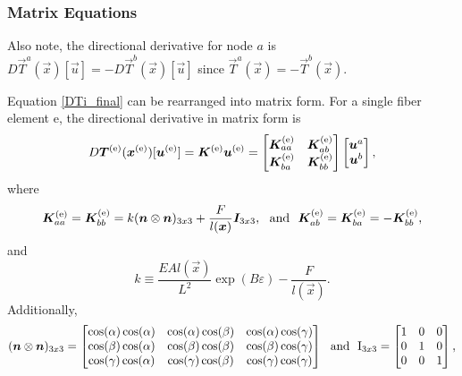 \subsubsection{Matrix Equations}
Also note,  the directional derivative for node $a$ is $D \vec{T}^a(\vec{x})[\vec{u}] = - D\vec{T}^b(\vec{x})[\vec{u}]$ since \(\vec{T}^a(\vec{x})=-\vec{T}^b(\vec{x})\).

Equation \eqref{DTi_final} can be rearranged into matrix form. For a single fiber element e, the directional derivative in matrix form is 
%
\begin{eqnarray}
D\bm{T}^{(\text{e})}(\bm{x}^{(\text{e})})[\bm{u}^{(\text{e})}] = \bm{K}^{(\text{e})}\bm{u}^{(\text{e})} = 
\begin{bmatrix} 
\bm{K}^{(\text{e})}_{aa} & \bm{K}^{(\text{e})}_{ab} \\ 
\bm{K}^{(\text{e})}_{ba}& \bm{K}^{(\text{e})}_{bb} \\
\end{bmatrix}
\begin{bmatrix} 
\bm{u}^{a}  \\ 
\bm{u}^{b} \\ 
\end{bmatrix},
\label{DT^e_matrix}
\end{eqnarray}
%
where
%
\begin{equation}
\bm{K}^{(\text{e})}_{aa} = \bm{K}^{(\text{e})}_{bb} = k (\bm{n} \otimes \bm{n})_{3x3} + \frac{F}{l(\bm{x})}\bm{I}_{3x3}, \ \ \text{and} \ \ \bm{K}^{(\text{e})}_{ab} = \bm{K}^{(\text{e})}_{ba} = -\bm{K}^{(\text{e})}_{bb},
\label{K_aa}
\end{equation}
%
and
%
\begin{equation}
k \equiv \frac{E A  l(\vec{x})}{L^2} \exp(B \varepsilon) -\frac{F}{l(\vec{x})}.
\label{k}
\end{equation}
%
Additionally, 
%
\begin{eqnarray}
(\vec{n} \otimes \vec{n})_{3x3} = 
\begin{bmatrix}
\cos(\alpha)\cos(\alpha) & \cos(\alpha) \cos(\beta) & \cos(\alpha) \cos(\gamma) \\
\cos(\beta)\cos(\alpha) & \cos(\beta)\cos(\beta) & \cos(\beta)\cos(\gamma) \\
\cos(\gamma)\cos(\alpha) & \cos(\gamma)\cos(\beta) & \cos(\gamma)\cos(\gamma) 
\end{bmatrix} \ \ \text{and} \ \
%
\mat{\text{I}}_{3x3} =
\begin{bmatrix}
1 & 0 & 0 \\
0 & 1 & 0 \\
0 & 0 & 1
\end{bmatrix},
\end{eqnarray}
